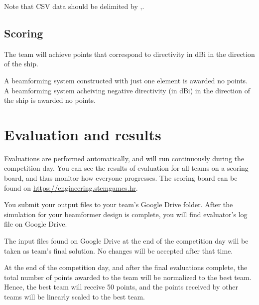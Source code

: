 \documentclass{article}[a4paper]
\begin{document}
Note that CSV data should be delimited by \textsf{,}.

\subsection*{Scoring}

The team will achieve points that correspond to directivity in dBi in the direction of the ship.

A beamforming system constructed with just one element is awarded no points. A beamforming system acheiving negative directivity (in dBi) in the direction of the ship is awarded no points.

\section*{Evaluation and results}

Evaluations are performed automatically, and will run continuously during the competition day. You can see the results of evaluation for all teams on a scoring board, and thus monitor how everyone progresses. The scoring board can be found on \url{https://engineering.stemgames.hr}.

You submit your output files to your team's Google Drive folder.
After the simulation for your beamformer design is complete, you will find evaluator's log file on Google Drive.

The input files found on Google Drive at the end of the competition day will be taken as team's final solution. No changes will be accepted after that time.

At the end of the competition day, and after the final evaluations complete, the total number of points awarded to the team will be normalized to the best team. Hence, the best team will receive 50 points, and the points received by other teams will be linearly scaled to the best team.
\end{document}
